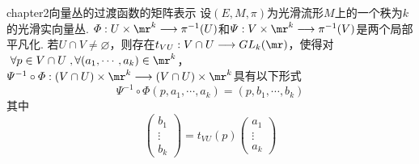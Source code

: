 \begin{mylem}{}{chapter2向量丛的过渡函数的矩阵表示}
	设$(E,M,\pi)$为光滑流形$M$上的一个秩为$k$的光滑实向量丛. $\varPhi:U\times\mr^{k}\longrightarrow \pi^{-1}(U)$和$\varPsi:V\times \mr^{k}\longrightarrow \pi^{-1}(V)$是两个局部平凡化. 若$U\cap V\neq\varnothing$，则存在{\color{red}{光滑映射}}$t_{VU}:V\cap U\longrightarrow GL_{k}(\mr)$，使得对$\;\forall p\in V\cap U\;,\forall(a_{1},\cdots,a_{k})\in \mr^{k}$，$\varPsi^{-1}\circ\varPhi:(V\cap U)\times\mr^{k}\longrightarrow (V\cap U)\times\mr^{k}$具有以下形式
	\[
	\varPsi^{-1}\circ\varPhi(p,a_{1},\cdots,a_{k})=(p,b_{1},\cdots,b_{k})
	\]
	其中
	\[
	\left( \begin{array}{ccc}{b_{1}} \\ {\vdots}  \\ {b_{k}} \end{array}\right)=t_{VU}(p) \left( \begin{array}{ccc}{a_{1}} \\ {\vdots}  \\ {a_{k}} \end{array}\right)
	\]
\end{mylem}
